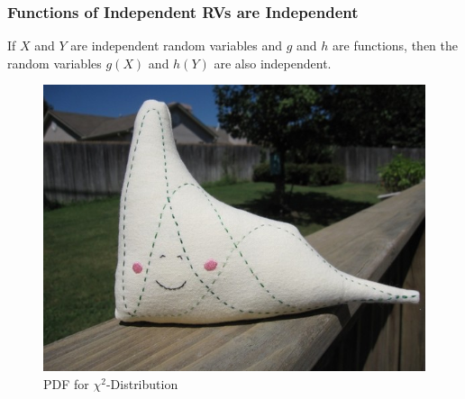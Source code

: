 \documentclass[handout]{beamer}
\begin{document}
\begin{frame}
\frametitle{Functions of Independent RVs are Independent}

If $X$ and $Y$ are independent random variables and $g$ and $h$ are functions, then the random variables $g(X)$ and $h(Y)$ are also independent.

\end{frame}



\begin{frame}
\begin{figure}
\includegraphics[scale = 0.45]{./images/chisq_etsy1}
\caption{PDF for $\chi^2$-Distribution}
\end{figure}
\end{frame}
\end{document}
